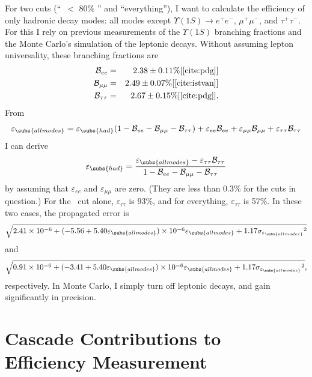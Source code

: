 For two cuts (``\pone\ $<$ 80\% \ebeam'' and ``everything''), I want
to calculate the efficiency of only hadronic decay modes: all modes
except $\Upsilon(1S) \to e^+e^-$, $\mu^+\mu^-$, and $\tau^+\tau^-$.
For this I rely on previous measurements of the $\Upsilon(1S)$
branching fractions and the Monte Carlo's simulation of the leptonic
decays.  Without assuming lepton universality, these branching
fractions are
\begin{eqnarray}
  \mathcal{B}_{ee} &=& 2.38 \pm 0.11\% [\ref{cite:pdg}] \\
  \mathcal{B}_{\mu\mu} &=& 2.49 \pm 0.07\% [\ref{cite:istvan}] \\
  \mathcal{B}_{\tau\tau} &=& 2.67 \pm 0.15\% [\ref{cite:pdg}] \mbox{.}
\end{eqnarray}
From
\begin{equation}
  \varepsilon_\subs{all modes} = \varepsilon_\subs{had}
  (1 - \mathcal{B}_{ee} - \mathcal{B}_{\mu\mu} -
  \mathcal{B}_{\tau\tau}) + \varepsilon_{ee} \mathcal{B}_{ee} +
  \varepsilon_{\mu\mu} \mathcal{B}_{\mu\mu} + \varepsilon_{\tau\tau}
  \mathcal{B}_{\tau\tau}
\end{equation}
I can derive
\begin{equation}
  \varepsilon_\subs{had} = \frac{\varepsilon_\subs{all modes} -
  \varepsilon_{\tau\tau} \mathcal{B}_{\tau\tau}}{1 - \mathcal{B}_{ee}
  - \mathcal{B}_{\mu\mu} - \mathcal{B}_{\tau\tau}}
\end{equation}
by assuming that $\varepsilon_{ee}$ and $\varepsilon_{\mu\mu}$ are
zero.  (They are less than 0.3\% for the cuts in question.)  For the
\pone\ cut alone, $\varepsilon_{\tau\tau}$ is 93\%, and for
everything, $\varepsilon_{\tau\tau}$ is 57\%.  In these two cases, the
propagated error is
\begin{equation}
  \sqrt{2.41\times 10^{-6} + (-5.56 + 5.40 {\varepsilon_\subs{all modes}})\times 10^{-6} {\varepsilon_\subs{all modes}} + 1.17 {\sigma_{\varepsilon_\subs{all modes}}}^2}
\end{equation}
and
\begin{equation}
  \sqrt{0.91\times 10^{-6} + (-3.41 + 5.40 {\varepsilon_\subs{all modes}})\times 10^{-6} {\varepsilon_\subs{all modes}} + 1.17 {\sigma_{\varepsilon_\subs{all modes}}}^2} \mbox{,}
\end{equation}
respectively.  In Monte Carlo, I simply turn off leptonic decays, and
gain significantly in precision.

\section{Cascade Contributions to Efficiency Measurement}

